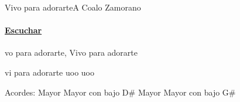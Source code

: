 \documentclass[12pt, spanish]{book}
\newcommand{\NotCCLIed}{\relax}
\begin{document}
    \begin{song}{Vivo para adorarte}{A}
        {} %
        {Coalo Zamorano}
        {} %
        {} %
        \ifChordBk
        \paragraph{\mbox{}\hfill\protect\href{https://open.spotify.com/intl-es/track/7tMF8vNNCch6Fxbxex4ewn}{Escuchar}\mbox{}\hfill}
        \fi

        \begin{SBOpGroup}
            vo para adorarte, Vivo para adorarte

              vi para adorarte uoo uoo    
        \end{SBOpGroup}

        \ifChordBk
        \begin{SBOpGroup}
            Acordes:\break
             Mayor \hfill
             Mayor con bajo D\# \hfill\null\break
             Mayor \hfill
             Mayor con bajo G\# \hfill\null\break
        \end{SBOpGroup}
        \fi
    \end{song}
\end{document}
